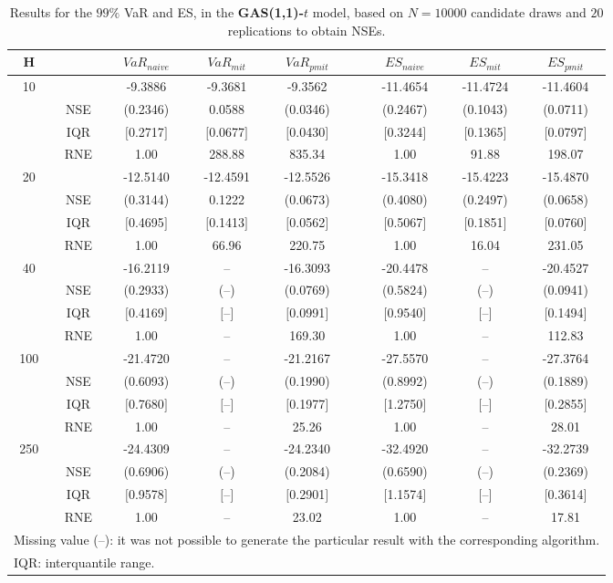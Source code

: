 \footnotesize{  
{ \renewcommand{\arraystretch}{1.3} 
\begin{longtable}{ccccccccc}  
\caption{Results for the $99\%$ VaR and ES, in the \textbf{GAS(1,1)-$t$} model, based on $N=10000$ candidate draws and $20$ replications to obtain NSEs.} 
\label{tab:res_algos_t_gas_ML} \\ 
 H & & $VaR_{naive}$ & $VaR_{mit}$ & $VaR_{pmit}$ &  & $ES_{naive}$ & $ES_{mit}$ & $ES_{pmit}$ \\ \hline 
10 & & -9.3886 & -9.3681 & -9.3562 & & -11.4654 & -11.4724 & -11.4604  \\ 
  & NSE & (0.2346) & 0.0588 & (0.0346) & & (0.2467) & (0.1043) & (0.0711)   \\ 
 & IQR & $[$0.2717$]$ & $[$0.0677$]$ & $[$0.0430$]$ & & $[$0.3244$]$ & $[$0.1365$]$ & $[$0.0797$]$  \\  
  & RNE &   1.00 & 288.88 & 835.34 & &   1.00 &  91.88 & 198.07   \\ [1ex] 
20 & & -12.5140 & -12.4591 & -12.5526 & & -15.3418 & -15.4223 & -15.4870  \\ 
  & NSE & (0.3144) & 0.1222 & (0.0673) & & (0.4080) & (0.2497) & (0.0658)   \\ 
 & IQR & $[$0.4695$]$ & $[$0.1413$]$ & $[$0.0562$]$ & & $[$0.5067$]$ & $[$0.1851$]$ & $[$0.0760$]$  \\  
  & RNE &   1.00 &  66.96 & 220.75 & &   1.00 &  16.04 & 231.05   \\ [1ex] 
40 & & -16.2119 & -- & -16.3093 & & -20.4478 & -- & -20.4527  \\ 
  & NSE & (0.2933) & (--) & (0.0769) & & (0.5824) & (--) & (0.0941)   \\ 
 & IQR & $[$0.4169$]$ & $[$--$]$& $[$0.0991$]$ & & $[$0.9540$]$ & $[$--$]$& $[$0.1494$]$  \\  
  & RNE &   1.00 & -- & 169.30 & &   1.00 & -- & 112.83   \\ [1ex] 
100 & & -21.4720 & -- & -21.2167 & & -27.5570 & -- & -27.3764  \\ 
  & NSE & (0.6093) & (--) & (0.1990) & & (0.8992) & (--) & (0.1889)   \\ 
 & IQR & $[$0.7680$]$ & $[$--$]$& $[$0.1977$]$ & & $[$1.2750$]$ & $[$--$]$& $[$0.2855$]$  \\  
  & RNE &   1.00 & -- &  25.26 & &   1.00 & -- &  28.01   \\ [1ex] 
250 & & -24.4309 & -- & -24.2340 & & -32.4920 & -- & -32.2739  \\ 
  & NSE & (0.6906) & (--) & (0.2084) & & (0.6590) & (--) & (0.2369)   \\ 
 & IQR & $[$0.9578$]$ & $[$--$]$& $[$0.2901$]$ & & $[$1.1574$]$ & $[$--$]$& $[$0.3614$]$  \\  
  & RNE &   1.00 & -- &  23.02 & &   1.00 & -- &  17.81   \\ [1ex] 
\hline 
  \multicolumn{9}{p{10cm}}{\footnotesize{Missing value (--): it was not possible to generate the particular result with the corresponding algorithm.}} \\ 
  \multicolumn{9}{l}{\footnotesize{IQR: interquantile range.}} \\ 
\end{longtable} 
} 
} 
